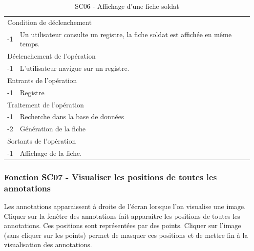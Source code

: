 \documentclass[a4paper]{article}
\begin{document}
\begin{table}[H]
  \centering
   \small
	\begin{tabular}{|c|p{12cm}|}
   		\hline
   			\rowcolor{lightgray}\multicolumn{2}{|c|}{\textbf{SC06 - Affichage d'une fiche soldat}} \\
   		\hline
   			\multicolumn{2}{|l|}{Condition de d\'eclenchement} \\
   		\hline
   		-1 & Un utilisateur consulte un registre, la fiche soldat est affich\'ee en m\^eme temps. \\
   		\hline
   			\multicolumn{2}{|l|}{D\'eclenchement de l'op\'eration} \\
   		\hline
   			-1 & L'utilisateur navigue sur un registre. \\
   		\hline
   			\multicolumn{2}{|l|}{Entrants de l'op\'eration} \\
   		\hline
   			-1 & Registre \\
   		\hline
   			\multicolumn{2}{|l|}{Traitement de l'op\'eration} \\
  		\hline
   			-1 & Recherche dans la base de donn\'ees \\
            -2 & G\'en\'eration de la fiche \\
   		\hline
   			\multicolumn{2}{|l|}{Sortants de l'op\'eration} \\
   		\hline
   			-1 & Affichage de la fiche. \\
   		\hline
	\end{tabular}
  \caption{SC06 - Affichage d'une fiche soldat}
  \normalsize
  \label{tab:affichage_fiche_soldat}
\end{table}


\subsubsection{Fonction SC07 - Visualiser les positions de toutes les annotations}
Les annotations apparaissent à droite de l’écran lorsque l’on visualise une image. Cliquer sur la fenêtre des annotations fait apparaitre les positions de toutes les annotations. Ces positions sont représentées par des points. Cliquer sur l’image (sans cliquer sur les points) permet de masquer ces positions et de mettre fin à la visualisation des annotations.\\
\end{document}

